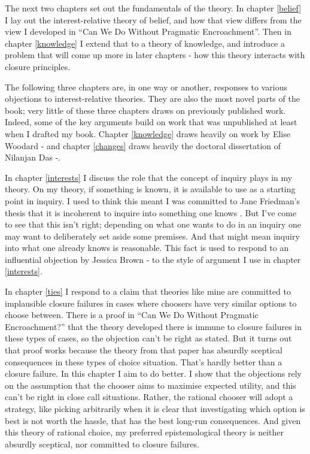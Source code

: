 \documentclass[
  11pt,
]{book}
\begin{document}
The next two chapters set out the fundamentals of the theory. In chapter \ref{belief} I lay out the interest-relative theory of belief, and how that view differs from the view I developed in ``Can We Do Without Pragmatic Encroachment''. Then in chapter \ref{knowledge} I extend that to a theory of knowledge, and introduce a problem that will come up more in later chapters - how this theory interacts with closure principles.

The following three chapters are, in one way or another, responses to various objections to interest-relative theories. They are also the most novel parts of the book; very little of these three chapters draws on previously published work. Indeed, some of the key arguments build on work that was unpublished at least when I drafted my book. Chapter \ref{knowledge} draws heavily on work by Elise Woodard -\citet{Woodard2021} and chapter \ref{changes} draws heavily the doctoral dissertation of Nilanjan Das -\citet{DasThesis}.

In chapter \ref{interests} I discuss the role that the concept of inquiry plays in my theory. On my theory, if something is known, it is available to use as a starting point in inquiry. I used to think this meant I was committed to Jane Friedman's thesis that it is incoherent to inquire into something one knows \citet{Friedman2019a}. But I've come to see that this isn't right; depending on what one wants to do in an inquiry one may want to deliberately set aside some premises. And that might mean inquiry into what one already knows is reasonable. This fact is used to respond to an influential objection by Jessica Brown -\citet{Brown2008} to the style of argument I use in chapter \ref{interests}.

In chapter \ref{ties} I respond to a claim that theories like mine are committed to implausible closure failures in cases where choosers have very similar options to choose between. There is a proof in ``Can We Do Without Pragmatic Encroachment?'' that the theory developed there is immune to closure failures in these types of cases, so the objection can't be right as stated. But it turns out that proof works because the theory from that paper has absurdly sceptical consequences in these types of choice situation. That's hardly better than a closure failure. In this chapter I aim to do better. I show that the objections rely on the assumption that the chooser aims to maximise expected utility, and this can't be right in close call situations. Rather, the rational chooser will adopt a strategy, like picking arbitrarily when it is clear that investigating which option is best is not worth the hassle, that has the best long-run consequences. And given this theory of rational choice, my preferred epistemological theory is neither absurdly sceptical, nor committed to closure failures.
\end{document}
